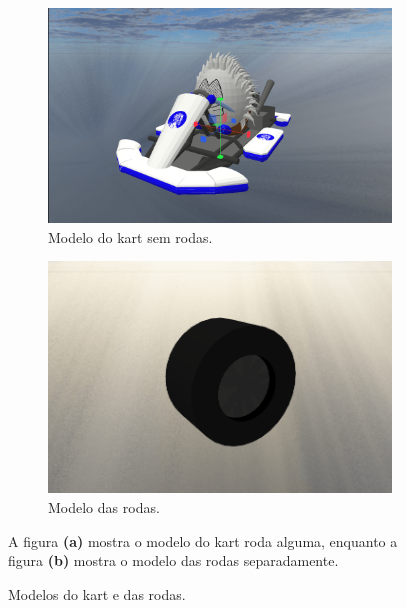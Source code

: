 \begin{figure}
    \centering
    \begin{subfigure}[t]{0.45\textwidth}
        \centering
        \includegraphics[width=1\textwidth]{figuras/Fluffy.png}
        \caption{Modelo do kart sem rodas.}
        \label{fig:kart}
    \end{subfigure}
    \hfill
    \begin{subfigure}[t]{0.45\textwidth}
        \centering
        \includegraphics[width=1\textwidth]{figuras/Modelo da roda.png}
        \caption{Modelo das rodas.}
        \label{fig:rodas}
    \end{subfigure}
    \caption{Modelos do kart e das rodas.}
    \footnotesize{A figura \textbf{(a)} mostra o modelo do kart roda alguma, enquanto a figura \textbf{(b)} mostra o modelo das rodas separadamente.}
    \label{fig:kart-rodas}
\end{figure}


